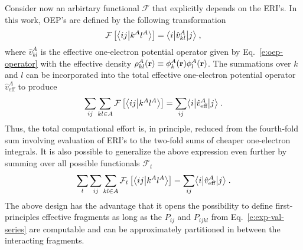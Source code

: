 Consider now an arbirtary functional $\mathcal{F}$ that explicitly depends on the 
ERI's. In this work, OEP's are defined by the following transformation
%
 \begin{equation}
 \mathcal{F}
 \left[ 
   \bigl\langle {ij} \bigl\lvert {k^Al^A} \bigr\rangle
	 \right] = \bigl\langle {i} \bigl\lvert {\hat{v}_{kl}^A} \bigl\lvert {j} \bigr\rangle  \;,
 \end{equation}
%
where 
$\hat{v}_{kl}^A$ is the effective one-electron potential operator given by Eq.~\eqref{e:oep-operator} 
with the
effective density $\rho_{kl}^A({\bf r}) \equiv \phi_k^A({\bf r})\phi_l^A({\bf r})$.
The summations over $k$ and $l$ can be incorporated into the total effective one-electron potential operator
$\hat{v}_{\text{eff}}^A$
to produce
%
\begin{equation}
	\sum_{ij}\sum_{kl\in A} \mathcal{F}\left[ 
   \bigl\langle {ij} \bigl\lvert {k^Al^A} \bigr\rangle
 \right] = \sum_{ij} \bigl\langle {i} \bigl\lvert {\hat{v}_{\text{eff}}^A} \bigl\lvert {j} \bigr\rangle  \;.
\end{equation}
%
Thus, the total computational effort is, in principle, reduced from the fourth-fold
sum involving evaluation of ERI's to the two-fold sums of cheaper one-electron integrals.
It is also possible to generalize the above expression even further by
summing over all possible functionals ${\mathcal{F}}_t$
%
\begin{equation} \label{e:ft-reduction}
	\sum_t \sum_{ij}\sum_{kl\in A} {\mathcal{F}}_t\left[ 
   \bigl\langle {ij} \bigl\lvert {k^Al^A} \bigr\rangle
 \right] = \sum_{ij} \bigl\langle {i} \bigl\lvert {\hat{v}_{\text{eff}}^A} \bigl\lvert {j} \bigr\rangle \;.
\end{equation}
%
The above design has the advantage that it opens the possibility to define first\hyp{}principles
effective fragments as long as the $P_{ij}$ and $P_{ijkl}$ 
from Eq.~\eqref{e:exp-val-series} are computable and can be approximately
partitioned in between the interacting fragments.



